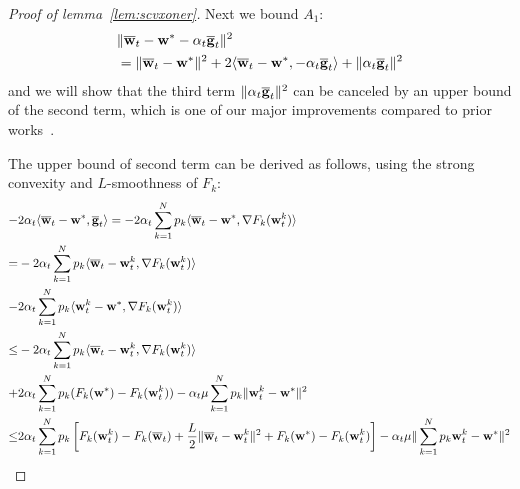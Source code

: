 \begin{proof}[Proof of lemma~\ref{lem:scvxoner}]
	Next we bound $A_{1}$: 
	\begin{align*}
	&\|{\overline{\mathbf{w}}}_{t}-{\mathbf{w}}^{\ast}-\alpha_{t}{\overline{\mathbf{g}}}_{t}\|^{2} \\ &=\|{\overline{\mathbf{w}}}_{t}-{\mathbf{w}}^{\ast}\|^{2}+2\langle{\overline{\mathbf{w}}}_{t}-{\mathbf{w}}^{\ast},-\alpha_{t}{\overline{\mathbf{g}}}_{t}\rangle+\|\alpha_{t}{\overline{\mathbf{g}}}_{t}\|^{2}
	\end{align*}
	and we will show that the third term $\|\alpha_{t}{\overline{\mathbf{g}}}_{t}\|^{2}$
	can be canceled by an upper bound of the second term, which is one of our major improvements compared to prior works~\cite{li2019convergence}.
	\begin{comment}
	The last term is straightforward to bound by the convexity of $\|\cdot\|^{2}$
	and $L$-smoothness of $F_{k}$,
	\begin{align*}
	\alpha_{t}^{2}\|\ov{g}_{t}\|^{2} & \leq\alpha_{t}^{2}\sum_{k=1}^{N}p_{k}\|\nabla F_{k}(\vw_{t}^{k})\|^{2}\leq2L\alpha_{t}^{2}\sum_{k=1}^{N}p_{k}(F_{k}(\vw_{t}^{k})-F_{k}^{\ast})
	\end{align*}
	or 
	\begin{align*}
	\alpha_{t}^{2}\|\ov{g}_{t}\|^{2} & \leq\alpha_{t}^{2}\sum_{k=1}^{N}p_{k}\|\nabla F_{k}(\vw_{t}^{k})\|^{2}\leq\alpha_{t}^{2}\sum_{k=1}^{N}p_{k}\mathbb{E}\|\nabla F_{k}(\vw_{t}^{k},\mathbf{\xi}_{t}^{k})\|^{2}\leq\alpha_{t}^{2}G^{2}
	\end{align*}
	\end{comment}
	The upper bound of second term can be derived as follows, 	using the strong convexity and $L$-smoothness of $F_{k}$:
	\begin{align*}
	 -&2\alpha_{t}\langle\ov{w}_{t}-\vw^{\ast},\ov{g}_{t}\rangle= -2\alpha_{t}\sum_{k=1}^{N}p_{k}\langle\ov{w}_{t}-\vw^{\ast},\nabla F_{k}(\vw_{t}^{k})\rangle\\
	= &-2\alpha_{t}\sum_{k=1}^{N}p_{k}\langle\ov{w}_{t}-\vw_{t}^{k},\nabla F_{k}(\vw_{t}^{k})\rangle\\
	-&2\alpha_{t}\sum_{k=1}^{N}p_{k}\langle \vw_{t}^{k}-\vw^{\ast},\nabla F_{k}(\vw_{t}^{k})\rangle\\
	\leq&-2\alpha_{t}\sum_{k=1}^{N}p_{k}\langle\ov{w}_{t}-\vw_{t}^{k},\nabla F_{k}(\vw_{t}^{k})\rangle\\
	+&2\alpha_{t}\sum_{k=1}^{N}p_{k}(F_{k}(\vw^{\ast})-F_{k}(\vw_{t}^{k}))-\alpha_{t}\mu\sum_{k=1}^{N}p_{k}\|\vw_{t}^{k}-\vw^{\ast}\|^{2}\\
	\leq & 2\alpha_{t}\sum_{k=1}^{N}p_{k}\left[F_{k}(\vw_{t}^{k})-F_{k}(\ov{w}_{t})+\frac{L}{2}\|\ov{w}_{t}-\vw_{t}^{k}\|^{2}+F_{k}(\vw^{\ast})-F_{k}(\vw_{t}^{k})\right]-\alpha_{t}\mu\|\sum_{k=1}^{N}p_{k}\vw_{t}^{k}-\vw^{\ast}\|^{2}\\

\end{align*}
\end{proof}

